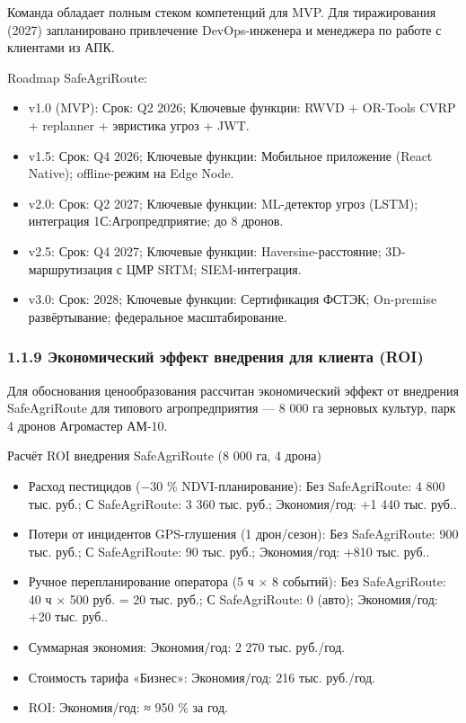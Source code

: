 \documentclass[14pt,a4paper]{extarticle}
\begin{document}
Команда обладает полным стеком компетенций для MVP. Для тиражирования (2027) запланировано привлечение DevOps-инженера и менеджера по работе с клиентами из АПК.

Roadmap SafeAgriRoute:

\begin{itemize}
\item v1.0 (MVP): Срок: Q2 2026; Ключевые функции: RWVD + OR-Tools CVRP + replanner + эвристика угроз + JWT.
\item v1.5: Срок: Q4 2026; Ключевые функции: Мобильное приложение (React Native); offline-режим на Edge Node.
\item v2.0: Срок: Q2 2027; Ключевые функции: ML-детектор угроз (LSTM); интеграция 1С:Агропредприятие; до 8 дронов.
\item v2.5: Срок: Q4 2027; Ключевые функции: Haversine-расстояние; 3D-маршрутизация с ЦМР SRTM; SIEM-интеграция.
\item v3.0: Срок: 2028; Ключевые функции: Сертификация ФСТЭК; On-premise развёртывание; федеральное масштабирование.
\end{itemize}


\hypertarget{ux44dux43aux43eux43dux43eux43cux438ux447ux435ux441ux43aux438ux439-ux44dux444ux444ux435ux43aux442-ux432ux43dux435ux434ux440ux435ux43dux438ux44f-ux434ux43bux44f-ux43aux43bux438ux435ux43dux442ux430-roi}{%
\subsubsection{1.1.9 Экономический эффект внедрения для клиента (ROI)}\label{ux44dux43aux43eux43dux43eux43cux438ux447ux435ux441ux43aux438ux439-ux44dux444ux444ux435ux43aux442-ux432ux43dux435ux434ux440ux435ux43dux438ux44f-ux434ux43bux44f-ux43aux43bux438ux435ux43dux442ux430-roi}}

Для обоснования ценообразования рассчитан экономический эффект от внедрения SafeAgriRoute для типового агропредприятия --- 8 000 га зерновых культур, парк 4 дронов Агромастер АМ-10.

Расчёт ROI внедрения SafeAgriRoute (8 000 га, 4 дрона)
\begin{itemize}
\item Расход пестицидов (−30 \% NDVI-планирование): Без SafeAgriRoute: 4 800 тыс. руб.; С SafeAgriRoute: 3 360 тыс. руб.; Экономия/год: +1 440 тыс. руб..
\item Потери от инцидентов GPS-глушения (1 дрон/сезон): Без SafeAgriRoute: 900 тыс. руб.; С SafeAgriRoute: 90 тыс. руб.; Экономия/год: +810 тыс. руб..
\item Ручное перепланирование оператора (5 ч × 8 событий): Без SafeAgriRoute: 40 ч × 500 руб. = 20 тыс. руб.; С SafeAgriRoute: 0 (авто); Экономия/год: +20 тыс. руб..
\item Суммарная экономия: Экономия/год: 2 270 тыс. руб./год.
\item Стоимость тарифа «Бизнес»: Экономия/год: 216 тыс. руб./год.
\item ROI: Экономия/год: ≈ 950 \% за год.
\end{itemize}
\end{document}
